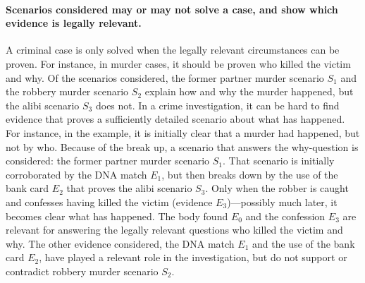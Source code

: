 \documentclass[10pt]{article}
\begin{document}
\paragraph{Scenarios considered may or may not solve a case, and show which evidence is legally relevant.} A criminal case is only solved when the legally relevant circumstances can be proven. For instance, in murder cases, it should be proven who killed the victim and why. Of the scenarios considered, the former partner murder scenario $S_1$ and the robbery murder scenario $S_2$ explain how and why the murder happened, but the alibi scenario $S_3$ does not. In a crime investigation, it can be hard to find evidence that proves a sufficiently detailed scenario about what has happened. For instance, in the example, it is initially clear that a murder had happened, but not by who. Because of the break up, a scenario that answers the why-question is considered: the former partner murder scenario $S_1$. That scenario is initially corroborated by the DNA match $E_1$, but then breaks down by the use of the bank card $E_2$ that proves the alibi scenario $S_3$. Only when the robber is caught and confesses having killed the victim (evidence $E_3$)---possibly much later, it becomes clear what has happened. The body found $E_0$ and the confession $E_3$ are relevant for answering the legally relevant questions who killed the victim and why. The other evidence considered, the DNA match $E_1$ and the use of the bank card $E_2$, have played a relevant role in the investigation, but do not support or contradict robbery murder scenario $S_2$. 

%
%
\end{document}
